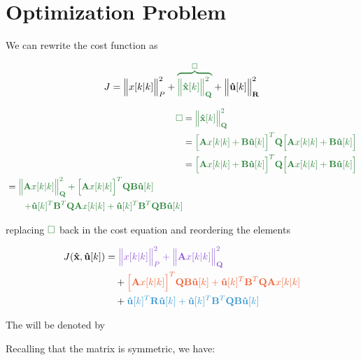 
\section{Optimization Problem}

We can rewrite the cost function as

\noindent
\begin{equation}
	J = \norma{x[k|k]}{P} + \green{\overbrace{\norma{\mathbf{\hat{x}}[k]}{\mathbf{Q}}}^{\square}} + \norma{\mathbf{\hat{u}}[k]}{\mathbf{R}}
\end{equation}

\noindent
\begin{align}
	\green{\square} 
	&= \green{\norma{\mathbf{\hat{x}}[k]}{\mathbf{Q}}} \\
	&= \green{\Big[ \mathbf{A}x[k|k] + \mathbf{B \hat{u}}[k] \Big]^T \mathbf{Q} \Big[ \mathbf{A}x[k|k] + \mathbf{B \hat{u}}[k] \Big]} \\
	&= \green{\Big[ \mathbf{A}x[k|k] + \mathbf{B \hat{u}}[k] \Big]^T \mathbf{Q} \Big[ \mathbf{A}x[k|k] + \mathbf{B \hat{u}}[k] \Big]} \\
	\begin{split}
		&= \green{\norma{\mathbf{A}x[k|k]}{\mathbf{Q}} + \Big[ \mathbf{A}x[k|k] \Big]^T \mathbf{Q} \mathbf{B \hat{u}}[k]} \\
		&\qquad \green{ + \mathbf{\hat{u}}[k]^T \mathbf{B}^T \mathbf{Q} \mathbf{A}x[k|k] + \mathbf{\hat{u}}[k]^T \mathbf{B}^T \mathbf{Q} \mathbf{B \hat{u}}[k]}
	\end{split}
\end{align}

\noindent
replacing $\green{\square}$ back in the cost equation and reordering the elements 

\noindent
\begin{align}
	J(\mathbf{\hat{x}}, \mathbf{\hat{u}}[k]) 
	&= \purple{ \norma{x[k|k]}{P} + \norma{\mathbf{A}x[k|k]}{\mathbf{Q}} } \\
	&\quad + \orange{\Big[\mathbf{A}x[k|k]\Big]^T \mathbf{Q} \mathbf{B} \mathbf{\hat{u}}[k]	+ \mathbf{\hat{u}}[k]^T \mathbf{B}^T \mathbf{Q} \mathbf{A} x[k|k]} \\
	&\quad + \blue{\mathbf{\hat{u}}[k]^T \mathbf{R} \mathbf{\hat{u}}[k] + \mathbf{\hat{u}}[k]^T \mathbf{B}^T \mathbf{Q} \mathbf{B} \mathbf{\hat{u}}[k]}
\end{align}

The  will be denoted by 

Recalling that the matrix  is symmetric, we have:

